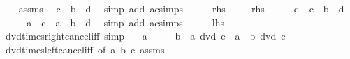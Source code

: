 \begin{isabellebody}
\isanewline
\ \ \isamarkupfalse%
\ assms\ \isamarkupfalse%
\ {\isachardoublequoteopen}c\ {\isacharequal}{\kern0pt}\ b\ {\isacharasterisk}{\kern0pt}\ d{\isachardoublequoteclose}\ \isamarkupfalse%
\ {\isacharparenleft}{\kern0pt}simp\ add{\isacharcolon}{\kern0pt}\ ac{\isacharunderscore}{\kern0pt}simps{\isacharparenright}{\kern0pt}\isanewline
\ \ \isamarkupfalse%
\ \isamarkupfalse%
\ {\isacharquery}{\kern0pt}rhs\ \isacommand{{\isachardot}{\kern0pt}{\isachardot}{\kern0pt}}\isamarkupfalse%
\isanewline
{}\isamarkupfalse%
\isanewline
\ \ \isamarkupfalse%
\ {\isacharquery}{\kern0pt}rhs\isanewline
\ \ \isamarkupfalse%
\ \isamarkupfalse%
\ d\ \ {\isachardoublequoteopen}c\ {\isacharequal}{\kern0pt}\ b\ {\isacharasterisk}{\kern0pt}\ d{\isachardoublequoteclose}\ \isacommand{{\isachardot}{\kern0pt}{\isachardot}{\kern0pt}}\isamarkupfalse%
\isanewline
\ \ \isamarkupfalse%
\ \isamarkupfalse%
\ {\isachardoublequoteopen}a\ {\isacharasterisk}{\kern0pt}\ c\ {\isacharequal}{\kern0pt}\ a\ {\isacharasterisk}{\kern0pt}\ b\ {\isacharasterisk}{\kern0pt}\ d{\isachardoublequoteclose}\ \isamarkupfalse%
\ {\isacharparenleft}{\kern0pt}simp\ add{\isacharcolon}{\kern0pt}\ ac{\isacharunderscore}{\kern0pt}simps{\isacharparenright}{\kern0pt}\isanewline
\ \ \isamarkupfalse%
\ \isamarkupfalse%
\ {\isacharquery}{\kern0pt}lhs\ \isacommand{{\isachardot}{\kern0pt}{\isachardot}{\kern0pt}}\isamarkupfalse%
\isanewline
{}\isamarkupfalse%
%
\endisatagproof
{\isafoldproof}%
%
\isadelimproof
\isanewline
%
\endisadelimproof
\isanewline
{}\isamarkupfalse%
\ dvd{\isacharunderscore}{\kern0pt}times{\isacharunderscore}{\kern0pt}right{\isacharunderscore}{\kern0pt}cancel{\isacharunderscore}{\kern0pt}iff\ {\isacharbrackleft}{\kern0pt}simp{\isacharbrackright}{\kern0pt}{\isacharcolon}{\kern0pt}\isanewline
\ \ \ {\isachardoublequoteopen}a\ {\isasymnoteq}\ {}{\isachardoublequoteclose}\isanewline
\ \ \ {\isachardoublequoteopen}b\ {\isacharasterisk}{\kern0pt}\ a\ dvd\ c\ {\isacharasterisk}{\kern0pt}\ a\ {\isasymlongleftrightarrow}\ b\ dvd\ c{\isachardoublequoteclose}\isanewline
%
\isadelimproof
\ \ %
\endisadelimproof
%
\isatagproof
{}\isamarkupfalse%
\ dvd{\isacharunderscore}{\kern0pt}times{\isacharunderscore}{\kern0pt}left{\isacharunderscore}{\kern0pt}cancel{\isacharunderscore}{\kern0pt}iff\ {\isacharbrackleft}{\kern0pt}of\ a\ b\ c{\isacharbrackright}{\kern0pt}\ assms\ \isamarkupfalse%

\end{isabellebody}
